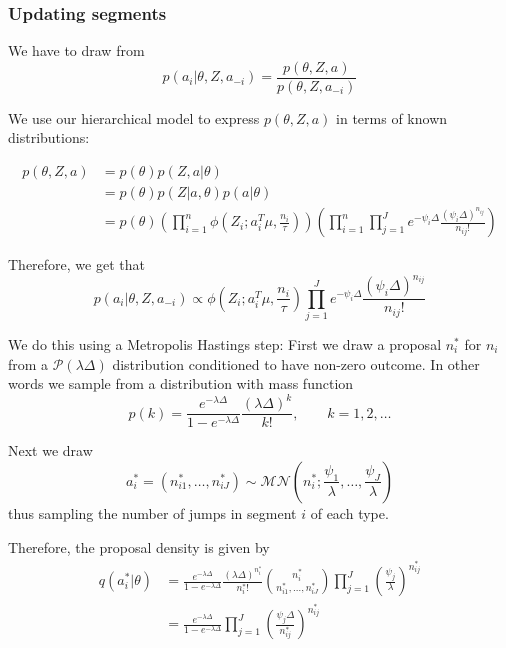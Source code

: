 \documentclass[a4paper,11pt]{article}
\theoremstyle{theorem}
\theoremstyle{definition}
\theoremstyle{remark}
\begin{document}
\subsubsection{Updating segments}

We have to draw from
\begin{equation}
p(a_i | \theta, Z, a_{-i}) = \frac{p(\theta, Z, a)}{p(\theta, Z, a_{-i})}
\end{equation}

We use our hierarchical model to express $p(\theta, Z, a)$ in terms of known distributions:

\begin{align*}
p(\theta, Z, a) &= p(\theta)p(Z, a | \theta) \\
&= p(\theta)p(Z | a, \theta)p(a | \theta) \\
&= p(\theta)\left(\prod_{i=1}^{n}{\phi\left(Z_i; a_{i}^T \mu, \frac{n_i}{\tau}\right)}\right)\left(\prod_{i=1}^{n}{\prod_{j=1}^{J}{e^{-\psi_i \Delta}\frac{(\psi_i \Delta)^{n_{ij}}}{n_{ij}!}}}\right)
\end{align*}

Therefore, we get that
\[
p(a_i | \theta, Z, a_{-i}) \propto \phi\left(Z_i; a_{i}^T \mu, \frac{n_i}{\tau}\right)\prod_{j=1}^{J}{e^{-\psi_i \Delta}\frac{(\psi_i \Delta)^{n_{ij}}}{n_{ij}!}}
\]

We do this using a Metropolis Hastings step:
First we draw a proposal $n_{i}^{\ast}$ for $n_i$ from a $\mathcal{P}(\lambda \Delta)$ distribution conditioned to have non-zero outcome. In other words we sample from a distribution with mass function
\[
p(k) = \frac{e^{-\lambda \Delta}}{1 - e^{-\lambda \Delta}} \frac{(\lambda \Delta)^k}{k!}, \qquad k = 1, 2, \dotsc
\]

Next we draw
\[
a_{i}^{\ast} = (n_{i1}^{\ast}, \dotsc, n_{iJ}^{\ast}) \sim \mathcal{MN}\left(n_{i}^{\ast}; \frac{\psi_1}{\lambda}, \dotsc, \frac{\psi_J}{\lambda}\right)
\]
thus sampling the number of jumps in segment $i$ of each type.

Therefore, the proposal density is given by
\begin{align*}
q(a_{i}^{\ast} | \theta) &= \frac{e^{-\lambda \Delta}}{1 - e^{-\lambda \Delta}} \frac{(\lambda \Delta)^{n_{i}^{\ast}}}{n_{i}^{\ast}!} \binom{n_{i}^{\ast}}{n_{i1}^{\ast}, \dotsc, n_{iJ}^{\ast}} \prod_{j=1}^{J}{\left(\frac{\psi_j}{\lambda}\right)^{n_{ij}^{\ast}}} \\
&= \frac{e^{-\lambda \Delta}}{1 - e^{-\lambda \Delta}} \prod_{j=1}^{J}{\left(\frac{\psi_j \Delta}{n_{ij}^{\ast}}\right)^{n_{ij}^{\ast}}}
\end{align*}
\end{document}
